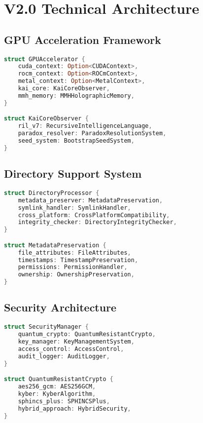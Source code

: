 \documentclass[12pt,a4paper]{article}
\begin{document}
\section{V2.0 Technical Architecture}

\subsection{GPU Acceleration Framework}
\begin{lstlisting}[language=Rust, caption=V2.0 GPU Architecture]
struct GPUAccelerator {
    cuda_context: Option<CUDAContext>,
    rocm_context: Option<ROCmContext>,
    metal_context: Option<MetalContext>,
    kai_core: KaiCoreObserver,
    mmh_memory: MMHHolographicMemory,
}

struct KaiCoreObserver {
    ril_v7: RecursiveIntelligenceLanguage,
    paradox_resolver: ParadoxResolutionSystem,
    seed_system: BootstrapSeedSystem,
}
\end{lstlisting}

\subsection{Directory Support System}
\begin{lstlisting}[language=Rust, caption=V2.0 Directory Processing]
struct DirectoryProcessor {
    metadata_preserver: MetadataPreservation,
    symlink_handler: SymlinkHandler,
    cross_platform: CrossPlatformCompatibility,
    integrity_checker: DirectoryIntegrityChecker,
}

struct MetadataPreservation {
    file_attributes: FileAttributes,
    timestamps: TimestampPreservation,
    permissions: PermissionHandler,
    ownership: OwnershipPreservation,
}
\end{lstlisting}

\subsection{Security Architecture}
\begin{lstlisting}[language=Rust, caption=V2.0 Security Framework]
struct SecurityManager {
    quantum_crypto: QuantumResistantCrypto,
    key_manager: KeyManagementSystem,
    access_control: AccessControl,
    audit_logger: AuditLogger,
}

struct QuantumResistantCrypto {
    aes256_gcm: AES256GCM,
    kyber: KyberAlgorithm,
    sphincs_plus: SPHINCSPlus,
    hybrid_approach: HybridSecurity,
}
\end{lstlisting}
\end{document}
